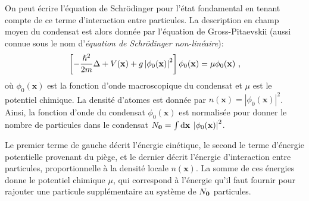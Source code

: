 On peut écrire l'équation de Schrödinger pour l'état fondamental en tenant compte de ce terme d'interaction entre particules. La description en champ moyen du condensat est alors donnée par l'équation de Gross-Pitaevskii (aussi connue sous le nom d'\emph{équation de Schrödinger non-linéaire}):
\begin{equation}
\left[ -\frac{\hslash^2}{2m}\Delta + V(\mathbf{x}) + g\left|\phi_0(\mathbf{x})\right|^2 \right] \phi_0(\mathbf{x}) = \mu \phi_0(\mathbf{x}) \text{ ,}
\label{eq:gross_pitaevskii}
\end{equation}
où $\phi_0(\mathbf{x})$ est la fonction d'onde macroscopique du condensat et $\mu$ est le potentiel chimique. La densité d'atomes est donnée par $n(\mathbf{x})=\left| \phi_0(\mathbf{x}) \right|^2$. Ainsi, la fonction d'onde du condensat $\phi_0(\mathbf{x})$ est normalisée pour donner le nombre de particules dans le condensat $N_{\mathbf{0}}=\int{\mathop{}\mathopen{}\mathrm{d}\mathbf{x} \: \left| \phi_0(\mathbf{x}) \right|^2}$.

Le premier terme de gauche décrit l'énergie cinétique, le second le terme d'énergie potentielle provenant du piège, et le dernier décrit l'énergie d'interaction entre particules, proportionnelle à la densité locale $n(\mathbf{x})$. La somme de ces énergies donne le potentiel chimique $\mu$, qui correspond à l'énergie qu'il faut fournir pour rajouter une particule supplémentaire au système de $N_{\mathbf{0}}$ particules.




